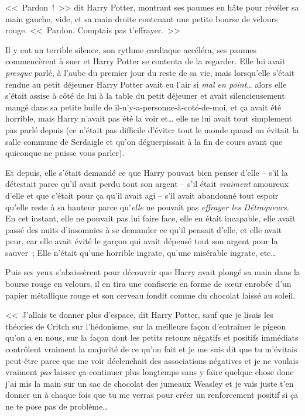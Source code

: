 <<~Pardon~!~>> dit Harry Potter, montrant ses paumes en hâte pour révéler sa main gauche, vide, et sa main droite contenant une petite bourse de velours rouge. <<~Pardon. Comptais pas t'effrayer.~>>

Il y eut un terrible silence, son rythme cardiaque accéléra, ses paumes commencèrent à suer et Harry Potter se contenta de la regarder. Elle lui avait \emph{presque} parlé, à l'aube du premier jour du reste de sa vie, mais lorsqu'elle s'était rendue au petit déjeuner Harry Potter avait eu l'air si \emph{mal en point}… alors elle s'était assise à côté de lui à la table du petit déjeuner et avait silencieusement mangé dans sa petite bulle de il-n'y-a-personne-à-coté-de-moi, et ça avait été horrible, mais Harry n'avait pas été la voir et… elle ne lui avait tout simplement pas parlé depuis (ce n'était pas difficile d'éviter tout le monde quand on évitait la salle commune de Serdaigle et qu'on déguerpissait à la fin de cours avant que quiconque ne puisse vous parler).

Et depuis, elle s'était demandé ce que Harry pouvait bien penser d'elle -- s'il la détestait parce qu'il avait perdu tout son argent -- s'il était \emph{vraiment} amoureux d'elle et que c'était pour ça qu'il avait agi -- s'il avait abandonné tout espoir qu'elle reste à sa hauteur parce qu'\emph{elle} ne pouvait pas \emph{effrayer les Détraqueurs}. En cet instant, elle ne pouvait pas lui faire face, elle en était incapable, elle avait passé des nuits d'insomnies à se demander ce qu'il pensait d'elle, et elle avait peur, car elle avait évité le garçon qui avait dépensé tout son argent pour la sauver~; Elle n'était qu'une horrible ingrate, qu'une misérable ingrate, etc…

Puis ses yeux s'abaissèrent pour découvrir que Harry avait plongé sa main dans la bourse rouge en velours, il en tira une confiserie en forme de cœur enrobée d'un papier métallique rouge et son cerveau fondit comme du chocolat laissé au soleil.

<<~J'allais te donner plus d'espace, dit Harry Potter, sauf que je lisais les théories de Critch sur l'hédonisme, sur la meilleure façon d'entraîner le pigeon qu'on a en nous, sur la façon dont les petits retours négatifs et positifs immédiats contrôlent vraiment la majorité de ce qu'on fait et je me suis dit que tu m'évitais peut-être parce que me voir déclenchait des associations négatives et je ne voulais vraiment \emph{pas} laisser ça continuer plus longtemps sans y faire quelque chose donc j'ai mis la main sur un sac de chocolat des jumeaux Weasley et je vais juste t'en donner un à chaque fois que tu me verras pour créer un renforcement positif si ça ne te pose pas de problème…


